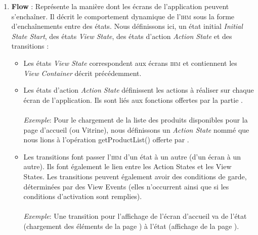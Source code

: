 \begin{enumerate}
\item \textbf{Flow} : Représente la manière dont les écrans de l'application peuvent s'enchaîner. Il décrit le comportement dynamique de l'\textsc{ihm} sous la forme d'enchaînements entre des états. Nous définissons ici, un état initial \textit{Initial State Start}, des états \textit{View State}, des états d'action \textit{Action State} et des transitions :
\begin{itemize}
\item Les états \textit{View State} correspondent aux écrans \textsc{ihm} et contiennent les \textit{View Container} décrit précédemment.
\item Les états d'action \textit{Action State} définissent les actions à réaliser sur chaque écran de l'application. Ils sont liés aux fonctions offertes par la partie \kwsoa{}. 
\paragraph{}
\textit{Exemple}: Pour le chargement de la liste des produits disponibles pour la page d'accueil (ou Vitrine), nous définissons un \textit{Action State} nommé  que nous lions à l'opération getProductList() offerte par \kwsoa{}.  
\item Les transitions  font passer l'\textsc{ihm} d'un état à un autre (d'un écran à un autre). Ils font également le lien entre les Action States et les View States. Les transitions peuvent également avoir des conditions de garde, déterminées par des View Events (elles n'occurrent ainsi que si les conditions d'activation sont remplies).
\paragraph{}
\textit{Exemple}: Une transition pour l'affichage de l'écran d'accueil  va de l'état  (chargement des éléments de la page ) à l'état  (affichage de la page ).

\end{itemize}
\end{enumerate}       


